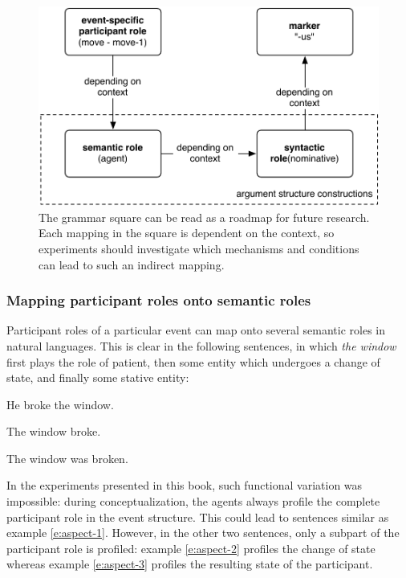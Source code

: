 \begin{figure} 
\centerline{\includegraphics[scale=0.7]{Chapter4/figs/case}}
  \caption[The grammatical square]{The grammar square can be read as a roadmap for future research. Each mapping in the square is dependent on the context, so experiments should investigate which mechanisms and conditions can lead to such an indirect mapping.}
   \label{f:square-bis}
\end{figure}

\subsubsection{Mapping participant roles onto semantic roles}
 Participant roles of a particular event can map onto several semantic roles in natural languages. This is clear in the following sentences, in which {\em the window} first plays the role of patient, then some entity which undergoes a change of state, and finally some stative entity:

\ea
He broke the window.
\label{e:aspect-1}
\item The window broke.
\label{e:aspect-2}
\item The window was broken.
\label{e:aspect-3}
\z

In the experiments presented in this book, such functional variation was impossible: during conceptualization, the agents always profile the complete participant role in the event structure. This could lead to sentences similar as example \ref{e:aspect-1}. However, in the other two sentences, only a subpart of the participant role is profiled: example \ref{e:aspect-2} profiles the change of state whereas example \ref{e:aspect-3} profiles the resulting state of the participant.

